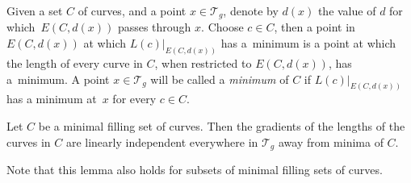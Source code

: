 Given a set $C$ of curves, and a point $x\in \mathcal{T}_{g}$, denote by $d(x)$ the value of $d$ for which~$E(C,d(x))$ passes through $x$. Choose $c\in C$, then a point in $E(C,d(x))$ at which $L(c)|_{E(C,d(x))}$ has a~minimum is a point at which the length of every curve in $C$, when restricted to $E(C,d(x))$, has a~minimum. A point $x\in \mathcal{T}_{g}$ will be called a \textit{minimum} of $C$ if $L(c)|_{E(C,d(x))}$ has a minimum at~$x$ for every $c\in C$.

\begin{Lemma}
\label{polyhedronargument}
Let $C$ be a minimal filling set of curves. Then the gradients of the lengths of the curves in $C$ are linearly independent everywhere in $\mathcal{T}_{g}$ away from minima of $C$.
\end{Lemma}
\begin{Remark}
Note that this lemma also holds for subsets of minimal filling sets of curves.
\end{Remark}

